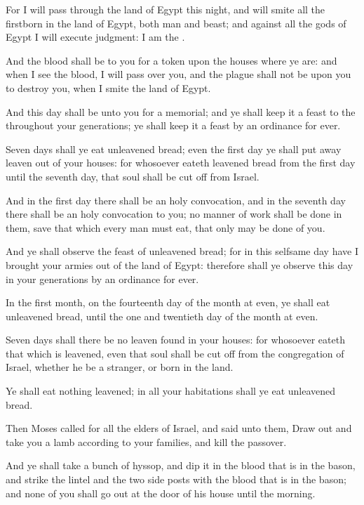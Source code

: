 \verse For I will pass through the land of Egypt this night, and will smite all the firstborn in the land of Egypt, both man and beast; and against all the gods of Egypt I will execute judgment: I am the \LORD.

\verse And the blood shall be to you for a token upon the houses where ye are: and when I see the blood, I will pass over you, and the plague shall not be upon you to destroy you, when I smite the land of Egypt.

\verse And this day shall be unto you for a memorial; and ye shall keep it a feast to the \LORD throughout your generations; ye shall keep it a feast by an ordinance for ever.

\verse Seven days shall ye eat unleavened bread; even the first day ye shall put away leaven out of your houses: for whosoever eateth leavened bread from the first day until the seventh day, that soul shall be cut off from Israel.

\verse And in the first day there shall be an holy convocation, and in the seventh day there shall be an holy convocation to you; no manner of work shall be done in them, save that which every man must eat, that only may be done of you.

\verse And ye shall observe the feast of unleavened bread; for in this selfsame day have I brought your armies out of the land of Egypt: therefore shall ye observe this day in your generations by an ordinance for ever.

\verse In the first month, on the fourteenth day of the month at even, ye shall eat unleavened bread, until the one and twentieth day of the month at even.

\verse Seven days shall there be no leaven found in your houses: for whosoever eateth that which is leavened, even that soul shall be cut off from the congregation of Israel, whether he be a stranger, or born in the land.

\verse Ye shall eat nothing leavened; in all your habitations shall ye eat unleavened bread.

\verse Then Moses called for all the elders of Israel, and said unto them, Draw out and take you a lamb according to your families, and kill the passover.

\verse And ye shall take a bunch of hyssop, and dip it in the blood that is in the bason, and strike the lintel and the two side posts with the blood that is in the bason; and none of you shall go out at the door of his house until the morning.

